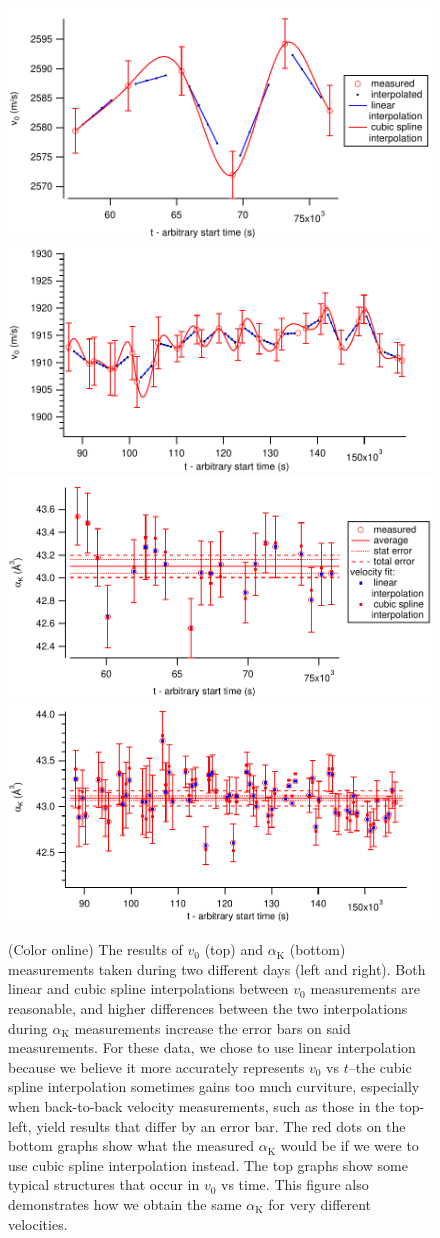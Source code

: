 \documentclass[twocolumn,prl,showpacs,superscriptaddress]{revtex4-1}   %
\newcommand{\ak}{\alpha_{\textrm{K}}}
\begin{document}
\begin{figure}
\includegraphics[width=0.49\linewidth,keepaspectratio]{velVsTime_150212.pdf}
\includegraphics[width=0.49\linewidth,keepaspectratio]{velVsTime_150413.pdf}
\includegraphics[width=0.49\linewidth,keepaspectratio]{polVsTime_150212.pdf}
\includegraphics[width=0.49\linewidth,keepaspectratio]{polVsTime_150413.pdf}
\caption{\label{velPolVsTimeExample}(Color online) The results of $v_0$ (top) and $\ak$ (bottom) measurements taken during two different days (left and right). Both linear and cubic spline interpolations between $v_0$ measurements are reasonable, and higher differences between the two interpolations during $\ak$ measurements increase the error bars on said measurements. For these data, we chose to use linear interpolation because we believe it more accurately represents $v_0$ vs $t$--the cubic spline interpolation sometimes gains too much curviture, especially when back-to-back velocity measurements, such as those in the top-left, yield results that differ by an error bar. The red dots on the bottom graphs show what the measured $\ak$ would be if we were to use cubic spline interpolation instead. The top graphs show some typical structures that occur in $v_0$ vs time. This figure also demonstrates how we obtain the same $\ak$ for very different velocities.}
\end{figure}
\end{document}
